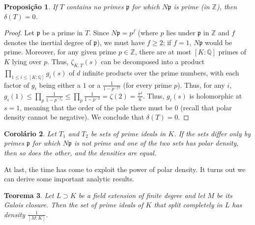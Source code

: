 \documentclass{article}
\newcommand{\QQ}{\mathbb{Q}}
\newcommand{\ZZ}{\mathbb{Z}}
\theoremstyle{plain}
\newtheorem{thm}{Teorema}
\newtheorem{cor}[thm]{Corolário}
\newtheorem{prop}[thm]{Proposição}
\theoremstyle{definition}
\theoremstyle{remark}
\numberwithin{equation}{section}
\numberwithin{thm}{section}
\begin{document}
\begin{prop} \label{4.3}
If $T$ contains no primes $\mathfrak{p}$ for which $N\mathfrak{p}$ is prime (in $\ZZ$), then $\delta(T) = 0$. 
\end{prop}

\begin{proof}
Let $\mathfrak{p}$ be a prime in $T$. Since $N\mathfrak{p} = p^{f}$ (where $p$ lies under $\mathfrak{p}$ in $\ZZ$ and $f$ denotes the inertial degree of $\mathfrak{p}$), we must have $f \geq 2$; if $f = 1$, $N\mathfrak{p}$ would be prime. Moreover, for any given prime $p \in \ZZ$, there are at most $[K : \QQ]$ primes of $K$ lying over $p$. Thus, $\zeta_{K, T}(s)$ can be decomposed into a product $\prod_{1 \leq i \leq [K : \QQ]} g_{i}(s)$ of $d$ infinite products over the prime numbers, with each factor of $g_i$ being either a $1$ or a $\frac{1}{1-p^{-fs}}$ (for every prime $p$). Thus, for any $i$, $g_{i}(1) \leq \prod_{p} \frac{1}{1-p^{-f_{p}}} \leq \prod_{p} \frac{1}{1-p^{-2}} = \zeta(2) = \frac{\pi^2}{6}$. Thus, $g_{i}(s)$ is holomorphic at $s = 1$, meaning that the order of the pole there must be $0$ (recall that polar density cannot be negative). We conclude that $\delta(T) = 0$. 
\end{proof}

\begin{cor} \label{4.4}
Let $T_1$ and $T_2$ be sets of prime ideals in $K$. If the sets differ only by primes $\mathfrak{p}$ for which $N\mathfrak{p}$ is not prime and one of the two sets has polar density, then so does the other, and the densities are equal. 
\end{cor}

At last, the time has come to exploit the power of polar density. It turns out we can derive some important analytic results.

\begin{thm} \label{4.5}
Let $L \supset K$ be a field extension of finite degree and let $M$ be its Galois closure. Then the set of prime ideals of $K$ that split completely in $L$ has density $\frac{1}{[M : K]}$. 
\end{thm}
\end{document}

